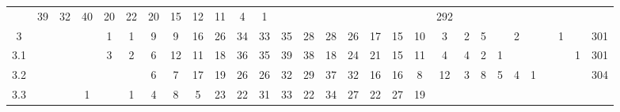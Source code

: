 \documentclass[12pt,english]{report}
\begin{document}
\begin{table}
{\begin{tabular}{@{\extracolsep{5pt}}|c|ccccccccccccccccccccccccccc|c|}
& 39                       & 32                       & 40
& 20                       & 22                       & 20
& 15                       & 12                       & 11
& 4                        & 1                        &
&                         &                         &                         &
&                         &    & 292         \\ \cline{1-1} \cline{29-29}
3           &                        &                         &
& 1                       & 1                       & 9
& 9                        & 16                       & 26
& 34                       & 33                       & 35
& 28                       & 28                       & 26
& 17                       & 15                       & 10
& 3                        & 2                        & 5
&                         & 2                       &                         &
& 1                       &    & 301         \\ \cline{1-1} \cline{29-29}
3.1         &                        &                         &
& 3                       & 2                       & 6
& 12                       & 11                       & 18
& 36                       & 35                       & 39
& 38                       & 18                       & 24
& 21                       & 15                       & 11
& 4                        & 4                        & 2
& 1                       &                         &                         &
&                         & 1  & 301         \\ \cline{1-1} \cline{29-29}
3.2         &                        &                         &
&                         &                         & 6
& 7                        & 17                       & 19
& 26                       & 26                       & 32
& 29                       & 37                       & 32
& 16                       & 16                       & 8
& 12                       & 3                        & 8
& 5                       & 4                       & 1                       &
&                         &    & 304         \\ \cline{1-1} \cline{29-29}
3.3         &                        &                         & 1
&                         & 1                       & 4
& 8                        & 5                        & 23
& 22                       & 31                       & 33
& 22                       & 34                       & 27
& 22                       & 27                       & 19

\end{tabular}}
\end{table}
\end{document}
